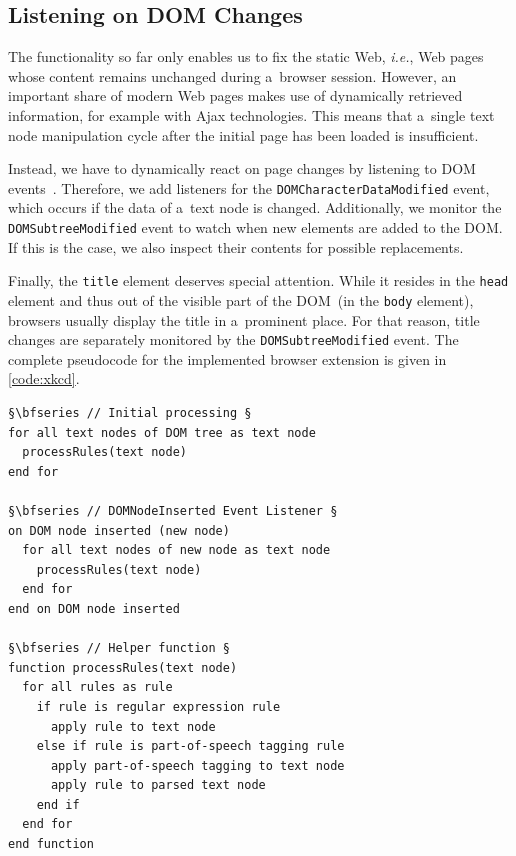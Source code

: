 \documentclass{sig-alternate}
\let\oldemph\emph
\renewcommand{\emph}[1]{\oldemph{\fontsize{9}{9}\selectfont #1}}
\begin{document}
\subsection{Listening on DOM Changes}
The functionality so far only enables us to fix the static Web, \emph{i.e.}, Web pages whose content remains unchanged during a~browser session.
However, an important share of modern Web pages makes use of dynamically retrieved information, for example with Ajax technologies.
This means that a~single text node manipulation cycle after the initial page has been loaded is insufficient.

Instead, we have to dynamically react on page changes by listening to DOM events~\cite{w3cevents2011}.
Therefore, we add listeners for the \Verb!DOMCharacterDataModified! event, which occurs if the data of a~text node is changed.
Additionally, we monitor the \Verb!DOMSubtreeModified! event to watch when new elements are added to the DOM.
If this is the case, we also inspect their contents for possible replacements.

Finally, the \Verb!title! element deserves special attention.
While it resides in the \Verb!head! element and thus out of the visible part of the DOM~(in the \Verb!body! element),
browsers usually display the title in a~prominent place.
For that reason, title changes are separately monitored by the \Verb!DOMSubtreeModified! event.
The complete pseudocode for the implemented browser extension is given in \autoref{code:xkcd}.

\begin{lstlisting}[caption=Pseudocode for the browser extension's logic., label=code:xkcd, float=h]
§\bfseries // Initial processing §
for all text nodes of DOM tree as text node
  processRules(text node)
end for  

§\bfseries // DOMNodeInserted Event Listener §
on DOM node inserted (new node)
  for all text nodes of new node as text node
    processRules(text node)
  end for  
end on DOM node inserted

§\bfseries // Helper function §
function processRules(text node)
  for all rules as rule
    if rule is regular expression rule
      apply rule to text node
    else if rule is part-of-speech tagging rule
      apply part-of-speech tagging to text node
      apply rule to parsed text node
    end if
  end for
end function  
\end{lstlisting} 
\end{document}

